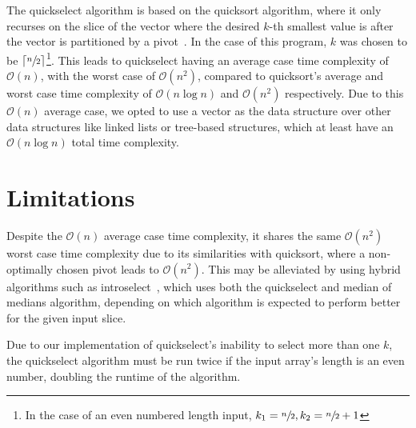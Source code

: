 \documentclass{report}
\begin{document}
The quickselect algorithm is based on the quicksort algorithm, where it only recurses on the slice of the vector where the desired \(k\)-th smallest value is after the vector is partitioned by a pivot~\autocite{hoare_algorithm_1961}. In the case of this program, \(k\) was chosen to be \(\lceil\sfrac{n}{2}\rceil\)\footnote{In the case of an even numbered length input, \(k_1 = \sfrac{n}{2}, k_2 = \sfrac{n}{2} + 1\)}. This leads to quickselect having an average case time complexity of \(\mathcal{O}(n)\), with the worst case of \(\mathcal{O}(n^2)\), compared to quicksort's average and worst case time complexity of \(\mathcal{O}(n \log{n})\) and \(\mathcal{O}(n^2)\) respectively. Due to this \(\mathcal{O}(n)\) average case, we opted to use a vector as the data structure over other data structures like linked lists or tree-based structures, which at least have an \(\mathcal{O}(n \log{n})\) total time complexity.

\section{Limitations}
Despite the \(\mathcal{O}(n)\) average case time complexity, it shares the same \(\mathcal{O}(n^2)\) worst case time complexity due to its similarities with quicksort, where a non-optimally chosen pivot leads to \(\mathcal{O}(n^2)\). This may be alleviated by using hybrid algorithms such as introselect~\autocite{musser_introspective_1997}, which uses both the quickselect and median of medians algorithm, depending on which algorithm is expected to perform better for the given input slice.

Due to our implementation of quickselect's inability to select more than one \(k\), the quickselect algorithm must be run twice if the input array's length is an even number, doubling the runtime of the algorithm.
\end{document}
